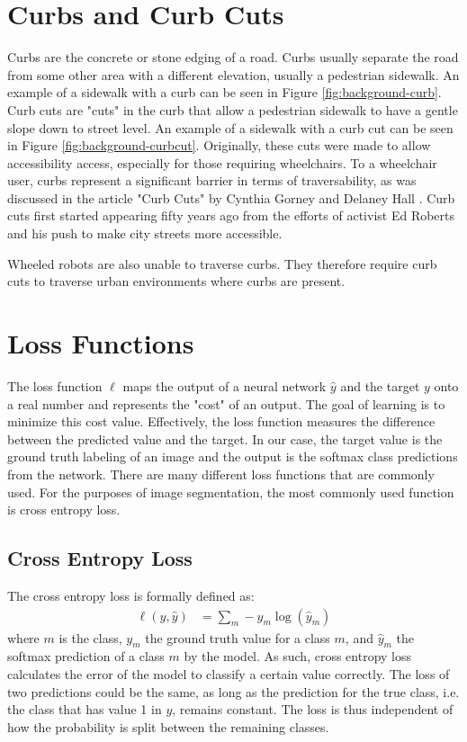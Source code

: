 \section{Curbs and Curb Cuts}\label{section:background-curbs}
Curbs are the concrete or stone edging of a road. Curbs usually separate the road from some other area with a different elevation, usually a pedestrian sidewalk.
An example of a sidewalk with a curb can be seen in Figure \ref{fig:background-curb}.
Curb cuts are "cuts" in the curb that allow a pedestrian sidewalk to have a gentle slope down to street level.
An example of a sidewalk with a curb cut can be seen in Figure \ref{fig:background-curbcut}.
Originally, these cuts were made to allow accessibility access, especially for those requiring wheelchairs.
To a wheelchair user, curbs represent a significant barrier in terms of traversability, as was discussed in the article "Curb Cuts" by Cynthia Gorney and Delaney Hall \cite{99pi}. 
Curb cuts first started appearing fifty years ago from the efforts of activist Ed Roberts and his push to make city streets more accessible.

Wheeled robots are also unable to traverse curbs.
They therefore require curb cuts to traverse urban environments where curbs are present.



\section{Loss Functions}\label{section:background-loss}
The loss function $\ell$ maps the output of a neural network $\hat{y}$ and the target $y$ onto a real number and represents the "cost" of an output.
The goal of learning is to minimize this cost value.
Effectively, the loss function measures the difference between the predicted value and the target.
In our case, the target value is the ground truth labeling of an image and the output is the softmax class predictions from the network.
There are many different loss functions that are commonly used. For the purposes of image segmentation, the most commonly used function is cross entropy loss.

\subsection{Cross Entropy Loss}\label{section:background-crossentropy}
The cross entropy loss is formally defined as:
\begin{align}
	\ell(y, \hat{y}) &=\sum_{m}-y_m\log(\hat{y}_m)
\end{align}
where $m$ is the class, $y_m$ the ground truth value for a class $m$, and $\hat{y}_m$ the softmax prediction of a class $m$ by the model. 
As such, cross entropy loss calculates the error of the model to classify a certain value correctly.
The loss of two predictions could be the same, as long as the prediction for the true class, i.e. the class that has value 1 in $y$, remains constant.
The loss is thus independent of how the probability is split between the remaining classes.


